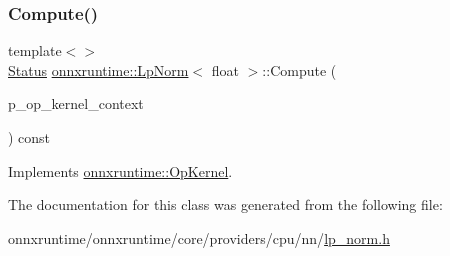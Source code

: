 \mbox{\label{classonnxruntime_1_1LpNorm_a5c25a7bd7e5c64e9b60a178135a72115}} 
\subsubsection{\texorpdfstring{Compute()}{Compute()}\hspace{0.1cm}{\footnotesize\ttfamily [2/2]}}
{\footnotesize\ttfamily template$<$$>$ \\
\mbox{\hyperlink{classonnxruntime_1_1common_1_1Status}{Status}} \mbox{\hyperlink{classonnxruntime_1_1LpNorm}{onnxruntime\+::\+Lp\+Norm}}$<$ float $>$\+::Compute (\begin{DoxyParamCaption}\item[{\mbox{\hyperlink{classonnxruntime_1_1OpKernelContext}{Op\+Kernel\+Context}} $\ast$}]{p\+\_\+op\+\_\+kernel\+\_\+context }\end{DoxyParamCaption}) const\hspace{0.3cm}{\ttfamily [virtual]}}



Implements \mbox{\hyperlink{classonnxruntime_1_1OpKernel_a9eca8656a78b1b3ab9d3351a12798650}{onnxruntime\+::\+Op\+Kernel}}.



The documentation for this class was generated from the following file\+:\begin{DoxyCompactItemize}
\item 
onnxruntime/onnxruntime/core/providers/cpu/nn/\mbox{\hyperlink{lp__norm_8h}{lp\+\_\+norm.\+h}}\end{DoxyCompactItemize}
